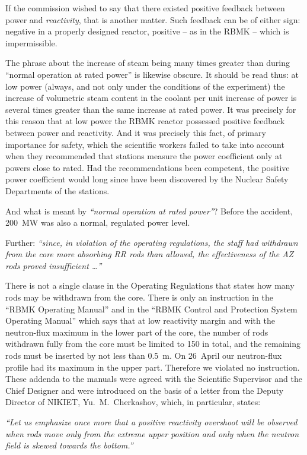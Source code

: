 \documentclass[openright]{bookest}
\begin{document}
If the commission wished to say that there existed positive feedback between power and \textit{reactivity}, that is another matter. Such feedback can be of either sign: negative in a properly designed reactor, positive -- as in the RBMK -- which is impermissible.

The phrase about the increase of steam being many times greater than during ``normal operation at rated power'' is likewise obscure. It should be read thus: at low power (always, and not only under the conditions of the experiment) the increase of volumetric steam content in the coolant per unit increase of power is several times greater than the same increase at rated power. It was precisely for this reason that at low power the RBMK reactor possessed positive feedback between power and reactivity. And it was precisely this fact, of primary importance for safety, which the scientific workers failed to take into account when they recommended that stations measure the power coefficient only at powers close to rated. Had the recommendations been competent, the positive power coefficient would long since have been discovered by the Nuclear Safety Departments of the stations.

And what is meant by \textit{``normal operation at rated power''}? Before the accident, \qty{200}{\mega\watt} was also a normal, regulated power level.

Further: \textit{``since, in violation of the operating regulations, the staff had withdrawn from the core more absorbing RR rods than allowed, the effectiveness of the AZ rods proved insufficient \ldots''}

There is not a single clause in the Operating Regulations that states how many rods may be withdrawn from the core. There is only an instruction in the ``RBMK Operating Manual'' and in the ``RBMK Control and Protection System Operating Manual'' which says that at low reactivity margin and with the neutron-flux maximum in the lower part of the core, the number of rods withdrawn fully from the core must be limited to \num{150} in total, and the remaining rods must be inserted by not less than \qty{0.5}{\metre}. On 26~April our neutron-flux profile had its maximum in the upper part. Therefore we violated no instruction. These addenda to the manuals were agreed with the Scientific Supervisor and the Chief Designer and were introduced on the basis of a letter from the Deputy Director of NIKIET, Yu.~M.~Cherkashov, which, in particular, states:

\begin{personal}
\textit{``Let us emphasize once more that a positive reactivity overshoot will be observed when rods move only from the extreme upper position and only when the neutron field is skewed towards the bottom.''}
\end{personal}
\end{document}
